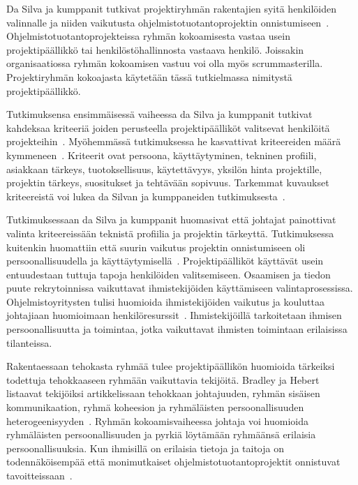 \documentclass[finnish]{tktltiki2}
\theoremstyle{definition}
\theoremstyle{remark}
\begin{document}
Da Silva ja kumppanit tutkivat projektiryhmän rakentajien syitä henkilöiden valinnalle ja niiden vaikutusta ohjelmistotuotantoprojektin onnistumiseen~\cite{daSilva2012, francca2009quantitative}. Ohjelmistotuotantoprojekteissa ryhmän kokoamisesta vastaa usein projektipäällikkö tai henkilöstöhallinnosta vastaava henkilö. Joissakin organisaatiossa ryhmän kokoamisen vastuu voi olla myös scrummasterilla. Projektiryhmän kokoajasta käytetään tässä tutkielmassa nimitystä projektipäällikkö.

Tutkimuksensa ensimmäisessä vaiheessa da Silva ja kumppanit tutkivat kahdeksaa kriteeriä joiden perusteella projektipäälliköt valitsevat henkilöitä projekteihin~\cite{francca2009quantitative}. Myöhemmässä tutkimuksessa he kasvattivat kriteereiden määrä kymmeneen~\cite{daSilva2012}. Kriteerit ovat persoona, käyttäytyminen, tekninen profiili, asiakkaan tärkeys, tuotoksellisuus, käytettävyys, yksilön hinta projektille, projektin tärkeys, suositukset ja tehtävään sopivuus. Tarkemmat kuvaukset kriteereistä voi lukea da Silvan ja kumppaneiden tutkimuksesta~\cite{daSilva2012}.

Tutkimuksessaan da Silva ja kumppanit huomasivat että johtajat painottivat valinta kriteereissään teknistä profiilia ja projektin tärkeyttä. Tutkimuksessa kuitenkin huomattiin että suurin vaikutus projektin onnistumiseen oli persoonallisuudella ja käyttäytymisellä~\cite{daSilva2012}. Projektipäälliköt käyttävät usein entuudestaan tuttuja tapoja henkilöiden valitsemiseen. Osaamisen ja tiedon puute rekrytoinnissa vaikuttavat ihmistekijöiden käyttämiseen valintaprosessissa. Ohjelmistoyritysten tulisi huomioida ihmistekijöiden vaikutus ja kouluttaa johtajiaan huomioimaan henkilöresurssit~\cite{daSilva2012}. Ihmistekijöillä tarkoitetaan ihmisen persoonallisuutta ja toimintaa, jotka vaikuttavat ihmisten toimintaan erilaisissa tilanteissa.

Rakentaessaan tehokasta ryhmää tulee projektipäällikön huomioida tärkeiksi todettuja tehokkaaseen ryhmään vaikuttavia tekijöitä. Bradley ja Hebert listaavat tekijöiksi artikkelissaan tehokkaan johtajuuden, ryhmän sisäisen kommunikaation, ryhmä koheesion ja ryhmäläisten persoonallisuuden heterogeenisyyden~\cite{bradley1997effect}. Ryhmän kokoamisvaiheessa johtaja voi huomioida ryhmäläisten persoonallisuuden ja pyrkiä löytämään ryhmäänsä erilaisia persoonallisuuksia. Kun ihmisillä on erilaisia tietoja ja taitoja on todennäköisempää että monimutkaiset ohjelmistotuotantoprojektit onnistuvat tavoitteissaan~\cite{bradley1997effect}.
\end{document}
